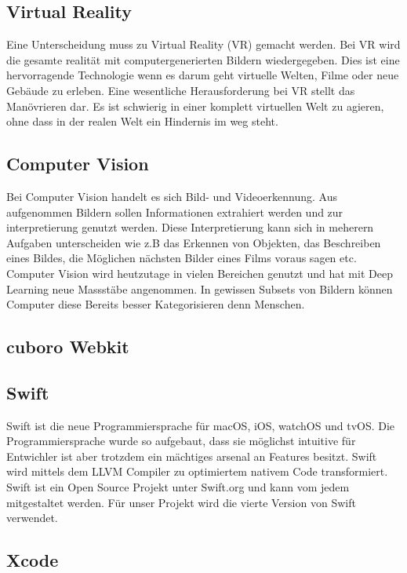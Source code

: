 \subsection{Virtual Reality} \label{sub:virtual-reality}
Eine Unterscheidung muss zu Virtual Reality (VR) gemacht werden. Bei VR wird die gesamte realität mit computergenerierten Bildern wiedergegeben. Dies ist eine hervorragende Technologie wenn es darum geht virtuelle Welten, Filme oder neue Gebäude zu erleben. Eine wesentliche Herausforderung bei VR stellt das Manövrieren dar. Es ist schwierig in einer komplett virtuellen Welt zu agieren, ohne dass in der realen Welt ein Hindernis im weg steht.

\subsection{Computer Vision} \label{sub:computer-vision}
Bei Computer Vision handelt es sich Bild- und Videoerkennung. Aus aufgenommen Bildern sollen Informationen extrahiert werden und zur interpretierung genutzt werden. Diese Interpretierung kann sich in meherern Aufgaben unterscheiden wie z.B das Erkennen von Objekten, das Beschreiben eines Bildes, die Möglichen nächsten Bilder eines Films voraus sagen etc. Computer Vision wird heutzutage in vielen Bereichen genutzt und hat mit Deep Learning neue Massstäbe angenommen. In gewissen Subsets von Bildern können Computer diese Bereits besser Kategorisieren denn Menschen.

\subsection{cuboro Webkit}

\subsection{Swift}
Swift ist die neue Programmiersprache für macOS, iOS, watchOS und tvOS. Die Programmiersprache wurde so aufgebaut, dass sie möglichst intuitive für Entwichler ist aber trotzdem ein mächtiges arsenal an Features besitzt. Swift wird mittels dem LLVM Compiler zu optimiertem nativem Code transformiert. Swift ist ein Open Source Projekt unter Swift.org und kann vom jedem mitgestaltet werden. Für unser Projekt wird die vierte Version von Swift verwendet.


\subsection{Xcode}
